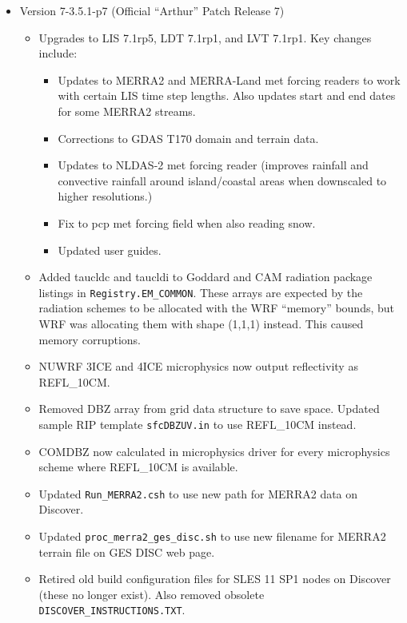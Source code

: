 \begin{itemize}
\item Version 7-3.5.1-p7 (Official ``Arthur'' Patch Release 7)
  \begin{itemize}
    \item Upgrades to LIS 7.1rp5, LDT 7.1rp1, and LVT 7.1rp1.  Key changes 
      include:
      \begin{itemize}
        \item Updates to MERRA2 and MERRA-Land met forcing readers to work 
          with certain LIS time step lengths. Also updates start and end dates
          for some MERRA2 streams.
        \item Corrections to GDAS T170 domain and terrain data.
        \item Updates to NLDAS-2 met forcing reader (improves rainfall and 
          convective rainfall around island/coastal areas when downscaled to 
          higher resolutions.)
        \item Fix to pcp met forcing field when also reading snow.
        \item Updated user guides.
      \end{itemize}
    \item Added taucldc and taucldi to Goddard and CAM radiation package 
      listings in \texttt{Registry.EM\_COMMON}.  These arrays are expected by 
      the radiation schemes to be allocated with the WRF ``memory'' bounds, 
      but WRF was allocating them with shape (1,1,1) instead.  This caused 
      memory corruptions.
    \item NUWRF 3ICE and 4ICE microphysics now output reflectivity as 
      REFL\_10CM.
    \item Removed DBZ array from grid data structure to save space.  Updated 
      sample RIP template \texttt{sfcDBZUV.in} to use REFL\_10CM instead.
    \item COMDBZ now calculated in microphysics driver for every microphysics 
      scheme where REFL\_10CM is available.
    \item Updated \texttt{Run\_MERRA2.csh} to use new path for MERRA2 data on 
      Discover.
    \item Updated \texttt{proc\_merra2\_ges\_disc.sh} to use new filename for 
      MERRA2 terrain file on GES DISC web page.
    \item Retired old build configuration files for SLES 11 SP1 nodes on 
      Discover (these no longer exist).  Also removed obsolete 
      \texttt{DISCOVER\_INSTRUCTIONS.TXT}.
  \end{itemize}
      

\end{itemize}
